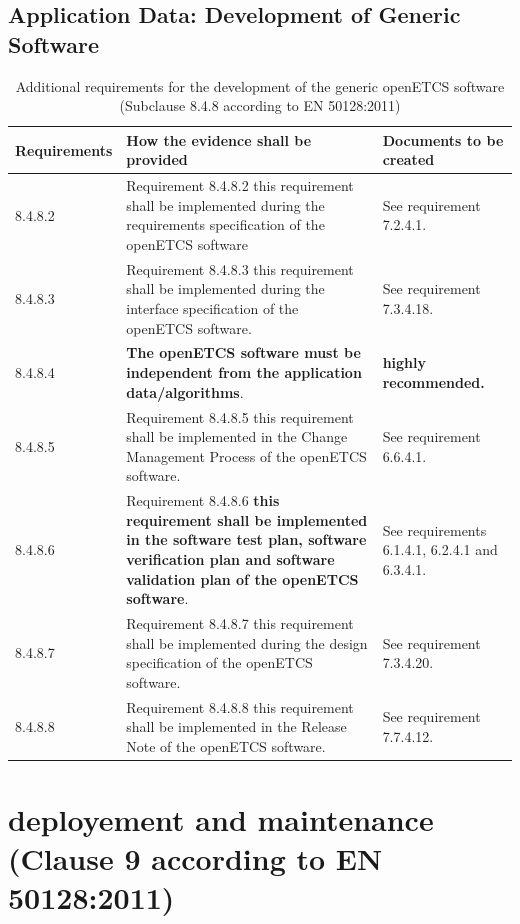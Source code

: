 \documentclass{template/openetcs_report}
\begin{document}
\subsection{Application Data: Development of Generic Software}
{\footnotesize\sffamily\centering
\begin{longtable}{|p{2cm}|p{9cm}|p{3cm}|}
\caption{Additional requirements for the development of the generic openETCS software (Subclause 8.4.8 according to EN 50128:2011)}\\
\hline
\bfseries Requirements & \bfseries How the evidence shall be provided & \bfseries Documents to be created\\
\hline
\hline
\endhead
\hline
\endfoot

8.4.8.2 & Requirement 8.4.8.2 this requirement shall be implemented during the requirements specification of the openETCS software   
& See requirement 7.2.4.1.\\ 
\hline
8.4.8.3 & Requirement 8.4.8.3 this requirement shall be implemented during the interface specification of the openETCS software. & See requirement 7.3.4.18.\\ 
\hline
8.4.8.4 & \textbf{The openETCS software must be independent from the application data/algorithms}.  & \textbf{highly recommended.}\\ 
\hline
8.4.8.5 & Requirement 8.4.8.5 this requirement shall be implemented in the Change Management Process of the openETCS software. & See requirement 6.6.4.1.\\ 
\hline
8.4.8.6 & Requirement 8.4.8.6 \textbf{this requirement shall be implemented in the software test plan, software verification plan and software validation plan of the openETCS software}. & See requirements 6.1.4.1, 6.2.4.1 and  6.3.4.1.\\ 
\hline
8.4.8.7 & Requirement 8.4.8.7 this requirement shall be implemented during the design specification of the openETCS software. & See requirement 7.3.4.20.\\ 
\hline
8.4.8.8 & Requirement 8.4.8.8 this requirement shall be implemented in the Release Note of the openETCS software. & See requirement 7.7.4.12.\\ 
\hline
\end{longtable}}





\section{deployement and maintenance (Clause 9 according to EN 50128:2011)}
\label{clause92}
\end{document}

